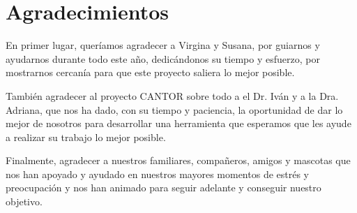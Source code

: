 
\chapter*{Agradecimientos}


En primer lugar, quer\'{i}amos agradecer a Virgina y Susana, por guiarnos y ayudarnos durante todo este a\~{n}o, dedic\'{a}ndonos su tiempo y esfuerzo, por mostrarnos cercan\'{i}a  para que este proyecto saliera lo mejor posible.

Tambi\'{e}n agradecer al proyecto CANTOR sobre todo a el Dr. Iv\'{a}n y a la Dra. Adriana, que nos ha dado, con su tiempo y paciencia, la oportunidad de dar lo mejor de nosotros para desarrollar una herramienta que esperamos que les ayude a realizar su trabajo lo mejor posible.

Finalmente, agradecer a nuestros familiares, compa\~{n}eros, amigos y mascotas que nos han apoyado y ayudado en nuestros mayores momentos de estr\'{e}s y preocupaci\'{o}n y nos han animado para seguir adelante y conseguir nuestro objetivo.












